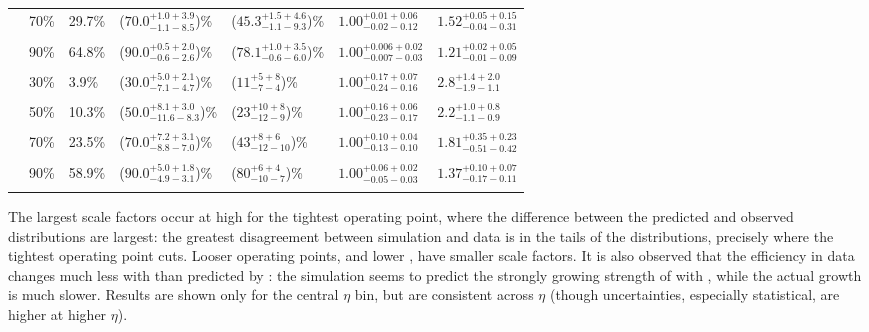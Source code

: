 \begin{table}[htbp]
\begin{center}
\begin{tabular}{|c|l|l|l|l|l|l|}
& 70\% & 29.7\% &  ($70.0^{+1.0+3.9}_{-1.1-8.5}$)\%  & ($45.3^{+1.5+4.6}_{-1.1-9.3}$)\% & $1.00^{+0.01+0.06}_{-0.02-0.12}$ & $1.52^{+0.05+0.15}_{-0.04-0.31}$ \\ &&&&&&\\
& 90\% & 64.8\% &  ($90.0^{+0.5+2.0}_{-0.6-2.6}$)\%  & ($78.1^{+1.0+3.5}_{-0.6-6.0}$)\% & $1.00^{+0.006+0.02}_{-0.007-0.03}$ & $1.21^{+0.02+0.05}_{-0.01-0.09}$ \\ &&&&&&\\
\hline\noalign{\smallskip}
\multirow{4}{*}{\begin{sideways}\centering$\pt=310$--$360 \GeV$\end{sideways}} 
& 30\% &  3.9\% & ($30.0^{+5.0+2.1}_{-7.1-4.7}$)\% & ($11^{+5+8}_{-7-4}$)\% & $1.00^{+0.17+0.07}_{-0.24-0.16}$ & $2.8^{+1.4+2.0}_{-1.9-1.1}$ \\&&&&&&\\
& 50\% & 10.3\% & ($50.0^{+8.1+3.0}_{-11.6-8.3}$)\%& ($23^{+10+8}_{-12-9}$)\%& $1.00^{+0.16+0.06}_{-0.23-0.17}$ & $2.2^{+1.0+0.8}_{-1.1-0.9}$ \\&&&&&&\\
& 70\% & 23.5\% & ($70.0^{+7.2+3.1}_{-8.8-7.0}$)\% & ($43^{+8+6}_{-12-10}$)\% & $1.00^{+0.10+0.04}_{-0.13-0.10}$ & $1.81^{+0.35+0.23}_{-0.51-0.42}$ \\&&&&&&\\
& 90\% & 58.9\% & ($90.0^{+5.0+1.8}_{-4.9-3.1}$)\% & ($80^{+6+4}_{-10-7}$)\% & $1.00^{+0.06+0.02}_{-0.05-0.03}$ & $1.37^{+0.10+0.07}_{-0.17-0.11}$ \\&&&&&&\\
\hline
\end{tabular}
\end{center}
\end{table}

The largest scale factors occur at high \pt for the tightest operating point, where the difference between the predicted and observed \ntrk distributions are largest: the greatest disagreement between simulation and data is in the tails of the distributions, precisely where the tightest operating point cuts. Looser operating points, and lower \pt, have smaller scale factors. It is also observed that the efficiency in data changes much less with \pt than predicted by \Pythia: the simulation seems to predict the strongly growing strength of \ntrk with \pt, while the actual growth is much slower. Results are shown only for the central $\eta$ bin, but are consistent across $\eta$ (though uncertainties, especially statistical, are higher at higher $\eta$).

